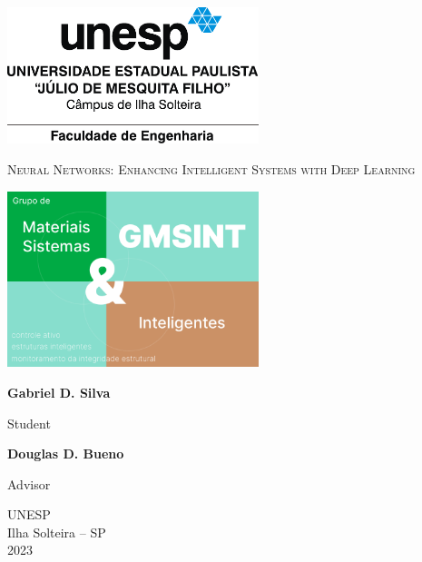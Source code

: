 \begin{titlepage}

\centering

\includegraphics[width=0.55\textwidth]{figures/logos/unesp-acessorio.pdf}



\vfill

{\LARGE\scshape Neural Networks: Enhancing Intelligent Systems with Deep Learning}

\vfill

\includegraphics[width=0.55\textwidth]{figures/logos/gmsint_logo_new.pdf}

\vfill

\textbf{Gabriel D. Silva}

Student

\textbf{Douglas D. Bueno}

Advisor



\vfill

UNESP \\
Ilha Solteira -- SP \\
2023
\end{titlepage}


     
